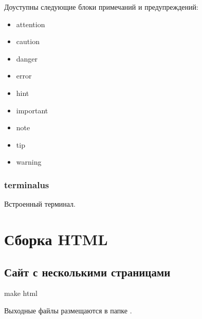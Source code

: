 \documentclass[letterpaper,12pt,russian]{sphinxmanual}
\begin{document}
Доуступны следующие блоки примечаний и предупреждений:
\begin{itemize}
\item {} 
attention

\item {} 
caution

\item {} 
danger

\item {} 
error

\item {} 
hint

\item {} 
important

\item {} 
note

\item {} 
tip

\item {} 
warning

\end{itemize}



\subsubsection{terminalus}
\label{\detokenize{editor:terminalus}}
Встроенный терминал.



\section{Сборка HTML}
\label{\detokenize{html:html}}\label{\detokenize{html::doc}}

\subsection{Сайт с несколькими страницами}
\label{\detokenize{html:id1}}
\begin{sphinxVerbatim}[commandchars=\\\{\}]
make html
\end{sphinxVerbatim}

Выходные файлы размещаются в папке .
\end{document}
